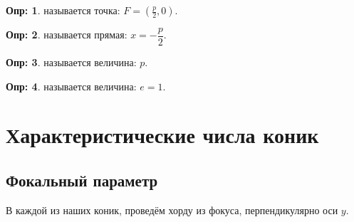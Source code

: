 \documentclass[12pt]{article}
\theoremstyle{definition}
\newtheorem{defn}{Опр:}
\begin{document}
\begin{defn}
	 называется точка: $F = \left(\tfrac{p}{2},0\right)$.
\end{defn}

\begin{defn}
	 называется прямая: $x = -\dfrac{p}{2}$.
\end{defn}

\begin{defn}
	 называется величина: $p$.
\end{defn}

\begin{defn}
	 называется величина: $e = 1$.
\end{defn}

\newpage
\section*{Характеристические числа коник}

\subsection*{Фокальный параметр}
В каждой из наших коник, проведём хорду из фокуса, перпендикулярно оси $y$.
\end{document}
